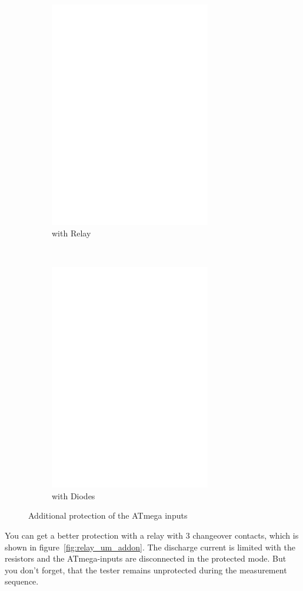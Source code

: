 \begin{figure}[H]
  \begin{subfigure}[b]{9cm}
    \centering
    \includegraphics[width=7cm]{../FIG/relay_addon.eps}
    \caption{with Relay}
  \end{subfigure}
  ~
  \begin{subfigure}[b]{9cm}
    \centering
    \includegraphics[width=7cm]{../FIG/diode_addon.eps}
    \caption{with Diodes}
  \end{subfigure}
  \caption{Additional protection of the ATmega inputs}
  \label{fig:relay_addon}
\end{figure}

You can get a better protection with a relay with 3 changeover contacts, which is shown in figure~\ref{fig:relay_um_addon}.
The discharge current is limited with the resistors and the ATmega-inputs are disconnected in the protected mode.
But you don't forget, that the tester remains unprotected during the measurement sequence.

